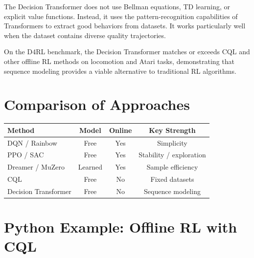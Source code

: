\begin{intuition}
The Decision Transformer does not use Bellman equations, TD learning, or
explicit value functions. Instead, it uses the pattern-recognition
capabilities of Transformers to extract good behaviors from datasets.
It works particularly well when the dataset contains diverse quality
trajectories.
\end{intuition}

\begin{example}
On the D4RL benchmark, the Decision Transformer matches or exceeds
CQL and other offline RL methods on locomotion and Atari tasks,
demonstrating that sequence modeling provides a viable alternative to
traditional RL algorithms.
\end{example}

\section{Comparison of Approaches}
\label{sec:comparison}

\begin{center}
\renewcommand{\arraystretch}{1.3}
\begin{tabular}{lccc}
    \toprule
    \textbf{Method} & \textbf{Model} & \textbf{Online} & \textbf{Key Strength} \\
    \midrule
    DQN / Rainbow & Free & Yes & Simplicity \\
    PPO / SAC & Free & Yes & Stability / exploration \\
    Dreamer / MuZero & Learned & Yes & Sample efficiency \\
    CQL & Free & No & Fixed datasets \\
    Decision Transformer & Free & No & Sequence modeling \\
    \bottomrule
\end{tabular}
\end{center}

\section{Python Example: Offline RL with CQL}
\label{sec:sota:code}

